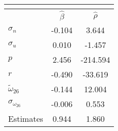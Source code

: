 \begin{tabular}{l*{2}{c}} 
\multicolumn{3}{c}{} \\ \toprule 
& $\hat{\beta}$ & $\hat{\rho}$ \\ \cmidrule(lr){2-3} 
  $\sigma_{n}$ & -0.104 & 3.644 \\ 
  $\sigma_{u}$ & 0.010 & -1.457 \\ 
  $p$ & 2.456 & -214.594 \\ 
  $r$ & -0.490 & -33.619 \\ 
  $\tilde{\omega}_{26}$ & -0.144 & 12.004 \\ 
  $\sigma_{\omega_{26}}$ & -0.006 & 0.553 \\ 
 \midrule Estimates& 0.944 & 1.860 \\ \bottomrule 
 \end{tabular}